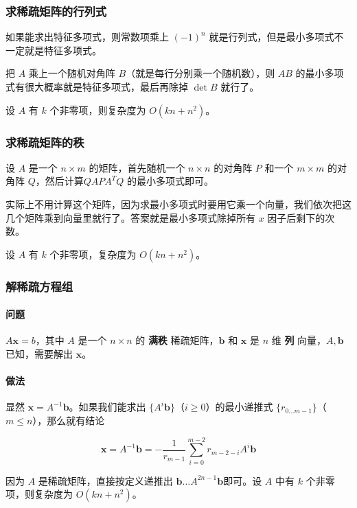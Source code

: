 \subsubsection{求稀疏矩阵的行列式}

	如果能求出特征多项式，则常数项乘上 $(-1)^n$ 就是行列式，但是最小多项式不一定就是特征多项式。

	把 $A$ 乘上一个随机对角阵 $B$（就是每行分别乘一个随机数），则 $AB$ 的最小多项式有很大概率就是特征多项式，最后再除掉 $\det B$ 就行了。

	设 $A$ 有 $k$ 个非零项，则复杂度为 $O(kn + n ^ 2)$。

\subsubsection{求稀疏矩阵的秩}

	设 $A$ 是一个 $n\times m$ 的矩阵，首先随机一个 $n\times n$ 的对角阵 $P$ 和一个 $m\times m$ 的对角阵 $Q$，然后计算$Q A P A^T Q$ 的最小多项式即可。

	实际上不用计算这个矩阵，因为求最小多项式时要用它乘一个向量，我们依次把这几个矩阵乘到向量里就行了。答案就是最小多项式除掉所有 $x$ 因子后剩下的次数。

	设 $A$ 有 $k$ 个非零项，复杂度为 $O(kn + n ^ 2)$。

\subsubsection{解稀疏方程组}

	\paragraph{问题} $A \boldsymbol{x} = b$，其中 $A$ 是一个 $n \times n$ 的 \textbf{满秩} 稀疏矩阵，$\boldsymbol{b}$ 和 $\boldsymbol{x}$ 是 $n$ 维 \textbf{列} 向量，$A, \boldsymbol{b}$ 已知，需要解出 $\boldsymbol{x}$。

	\paragraph{做法} 显然 $\boldsymbol{x} = A^{-1} \boldsymbol{b}$。如果我们能求出 $\{A^i \boldsymbol{b}\}$（$i \ge 0$）的最小递推式 $\{r_{0 \dots m - 1}\}$（$m \le n$），那么就有结论

	$$ \boldsymbol{x} = A^{-1} \boldsymbol{b} = -\frac 1 {r_{m - 1}} \sum_{i = 0} ^ {m - 2} r_{m - 2 - i} A^i \boldsymbol{b} $$

	因为 $A$ 是稀疏矩阵，直接按定义递推出 $\boldsymbol{b} \dots A^{2n - 1} \boldsymbol{b}$即可。设 $A$ 中有 $k$ 个非零项，则复杂度为 $O(kn + n^2)$。
	
	\inputminted{cpp}{../src/math/解稀疏方程组.cpp}

